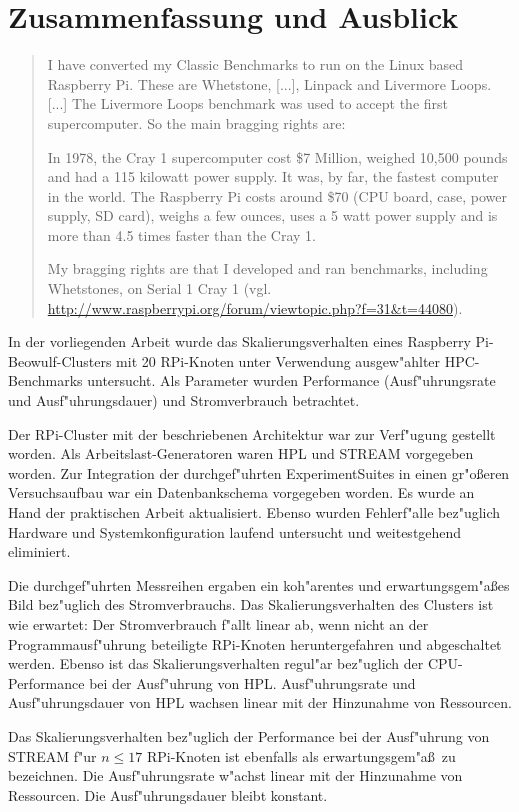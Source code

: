 \chapter{Zusammenfassung und Ausblick}\label{Kap5}
\begin{quote}
\onehalfspacing
I have converted my Classic Benchmarks to run on the Linux based Raspberry Pi. These are Whetstone, [...], Linpack and Livermore Loops. [...] The Livermore Loops benchmark was used to accept the first supercomputer. So the main bragging rights are:

In 1978, the Cray 1 supercomputer cost \$7 Million, weighed 10,500 pounds and had a 115 kilowatt power supply. It was, by far, the fastest computer in the world. The Raspberry Pi costs around \$70 (CPU board, case, power supply, SD card), weighs a few ounces, uses a 5 watt power supply and is more than 4.5 times faster than the Cray 1. 

My bragging rights are that I developed and ran benchmarks, including Whetstones, on Serial 1 Cray 1 (vgl. \url{http://www.raspberrypi.org/forum/viewtopic.php?f=31&t=44080}).
\end{quote}
In der vorliegenden Arbeit wurde das Skalierungsverhalten eines Raspberry Pi-Beowulf-Clusters mit 20 RPi-Knoten unter Verwendung ausgew"ahlter HPC-Benchmarks untersucht. Als Parameter wurden Performance (Ausf"uhrungsrate und Ausf"uhrungsdauer) und Stromverbrauch betrachtet. 

Der RPi-Cluster mit der beschriebenen Architektur war zur Verf"ugung gestellt worden. Als Arbeitslast-Generatoren waren HPL und STREAM vorgegeben worden. Zur Integration der durchgef"uhrten ExperimentSuites in einen gr"o\ss eren Versuchsaufbau war ein Datenbankschema vorgegeben worden. Es wurde an Hand der praktischen Arbeit aktualisiert. Ebenso wurden Fehlerf"alle bez"uglich Hardware und Systemkonfiguration laufend untersucht und weitestgehend eliminiert. 

Die durchgef"uhrten Messreihen ergaben ein koh"arentes und erwartungsgem"a\ss es Bild be\-z"ug\-lich des Stromverbrauchs. Das Skalierungsverhalten des Clusters ist wie erwartet: Der Stromverbrauch f"allt linear ab, wenn nicht an der Programmausf"uhrung beteiligte RPi-Knoten heruntergefahren und abgeschaltet werden. Ebenso ist das Skalierungsverhalten regul"ar bez"uglich der CPU-Performance bei der Ausf"uhrung von HPL. Ausf"uhrungsrate und Ausf"uhrungsdauer von HPL wachsen linear mit der Hinzunahme von Ressourcen. 

Das Skalierungsverhalten bez"uglich der Performance bei der Ausf"uhrung von STREAM f"ur $n\leq 17$ RPi-Knoten ist ebenfalls als erwartungsgem"a\ss\ zu bezeichnen. Die Ausf"uhrungsrate w"achst linear mit der Hinzunahme von Ressourcen. Die Ausf"uhrungsdauer bleibt konstant. 

